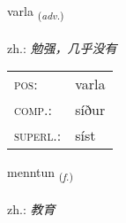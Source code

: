 \documentclass[frontgrid, backgrid]{flacards}\usepackage[]{graphicx}\usepackage[]{xcolor}
\begin{document}
\renewcommand{\flhead}{\vskip5pt \fboxsep=0pt {\small\bfseries\footnotesize Atviksorð | 副词}}
\renewcommand{\fcfoot}{\vskip5pt \fboxsep=0pt \hspace{2pt}{\small\bfseries\footnotesize 1K}}

\renewcommand{\blhead}{\vskip5pt {\small\bfseries\footnotesize Atviksorð | 副词 }}
\renewcommand{\bcfoot}{\vskip5pt \hspace{2pt}{\small\bfseries\footnotesize 1K}}


{varla \small{\textsubscript{(\textit{adv.})}} \\[1ex] %
\textphonetic{[vartla]} \\
zh.: \emph{勉强，几乎没有} \\  [2ex]
\renewcommand*{\arraystretch}{0.8}
\begin{tabular}{ll}
\textsc{pos}: & varla \\ 
\textsc{comp.}: & síður \\ 
\textsc{superl.}: & síst \\
\end{tabular}
}

\renewcommand{\flhead}{\vskip5pt \fboxsep=0pt {\small\bfseries\footnotesize Nafnorð | 名词}}
\renewcommand{\fcfoot}{\vskip5pt \fboxsep=0pt \hspace{2pt}{\small\bfseries\footnotesize 1K}}

\renewcommand{\blhead}{\vskip5pt {\small\bfseries\footnotesize Nafnorð | 名词 }}
\renewcommand{\bcfoot}{\vskip5pt \hspace{2pt}{\small\bfseries\footnotesize 1K}}


{menntun \small{\textsubscript{(\textit{f.})}} \\[1ex] %
 \\
zh.: \emph{教育} \\  [2ex]
\renewcommand*{\arraystretch}{0.8}
}
\end{document}

